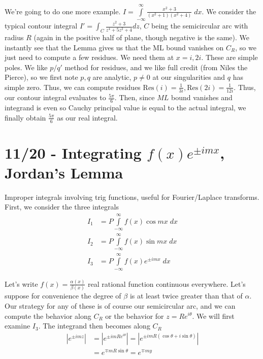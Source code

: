\documentclass[10pt]{report}
\newcommand{\abs}[1]{\left|#1\right|}
\newcommand{\Res}[0]{\mathrm{Res} }
\begin{document}
We're going to do one more example. $I = \displaystyle\int\limits_{-\infty}^{\infty}\frac{x^2 + 3}{(x^2 + 1)(x^2 + 4)}\;dx$. We consider the typical contour integral $I' = \int_C \frac{z^2 + 3}{z^4 + 5z^2 + 4} dz$, $C$ being the semicircular arc with radius $R$ (again in the positive half of plane, though negative is the same). We instantly see that the Lemma gives us that the ML bound vanishes on $C_R$, so we just need to compute a few residues. We need them at $x=i, 2i$. These are simple poles. We like $p/q'$ method for residues, and we like full credit (from Niles the Pierce), so we first note $p,q$ are analytic, $p \neq 0$ at our singularities and $q$ has simple zero. Thus, we can compute residues $\Res(i) = \frac{1}{3i}, \Res(2i) = \frac{1}{12i}$. Thus, our contour integral evaluates to $\frac{5\pi}{6}$. Then, since $ML$ bound vanishes and integrand is even so Cauchy principal value is equal to the actual integral, we finally obtain $\frac{5\pi}{6}$ as our real integral. 

\chapter{11/20 - Integrating $f(x) e^{\pm imx}$, Jordan's Lemma}

Improper integrals involving trig functions, useful for Fourier/Laplace transforms. First, we consider the three integrals
\begin{align*}
    I_1 &= P\displaystyle\int\limits_{-\infty}^{\infty}f(x)\cos mx\;dx\\
    I_2 &= P\displaystyle\int\limits_{-\infty}^{\infty}f(x)\sin mx\;dx\\
    I_3 &= P\displaystyle\int\limits_{-\infty}^{\infty}f(x) e^{\pm imx}\;dx
\end{align*}

Let's write $f(x) = \frac{\alpha(x)}{\beta(x)}$ real rational function continuous everywhere. Let's suppose for convenience the degree of $\beta$ is at least twice greater than that of $\alpha$. Our strategy for any of these is of course our semicircular arc, and we can compute the behavior along $C_R$ or the behavior for $z=Re^{i\theta}$. We will first examine $I_3$. The integrand then becomes along $C_R$
\begin{align*}
    \abs{e^{\pm imz}} &= \abs{e^{\pm imRe^{i\theta}}} = \abs{e^{\pm imR(\cos \theta + i\sin \theta)}}\\
    &= e^{\mp mR\sin \theta} = e^{\mp my}
\end{align*}
\end{document}
